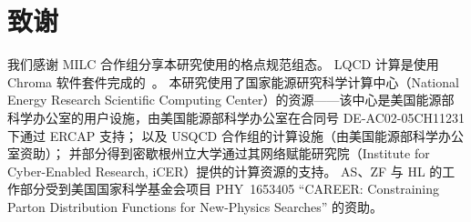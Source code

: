 \section*{致谢}
我们感谢 MILC 合作组分享本研究使用的格点规范组态。
LQCD 计算是使用 Chroma 软件套件完成的~\cite{Edwards:2004sx}。
本研究使用了国家能源研究科学计算中心（National Energy Research Scientific Computing Center）的资源——该中心是美国能源部科学办公室的用户设施，由美国能源部科学办公室在合同号 DE-AC02-05CH11231 下通过 ERCAP 支持；
以及 USQCD 合作组的计算设施（由美国能源部科学办公室资助）；
并部分得到密歇根州立大学通过其网络赋能研究院（Institute for Cyber-Enabled Research, iCER）提供的计算资源的支持。
AS、ZF 与 HL 的工作部分受到美国国家科学基金会项目 PHY~1653405 ``CAREER: Constraining Parton Distribution Functions for New-Physics Searches'' 的资助。


